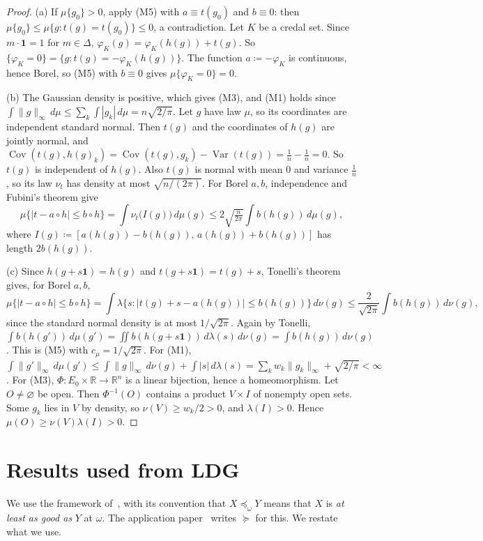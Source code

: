 \documentclass[11pt]{article}
\theoremstyle{definition}
\newcommand{\R}{\mathbb R}
\newcommand{\one}{\mathbf 1}
\begin{document}
\begin{proof}
(a) If $\mu\{g_0\}>0$, apply (M5) with $a\equiv t(g_0)$ and $b\equiv0$: then $\mu\{g_0\}\le\mu\{g:t(g)=t(g_0)\}\le0$, a contradiction. Let $K$ be a credal set. Since $m\cdot\one=1$ for $m\in\Delta$, $\varphi_K(g)=\varphi_K(h(g))+t(g)$. So $\{\varphi_K=0\}=\{g:t(g)=-\varphi_K(h(g))\}$. The function $a\coloneqq-\varphi_K$ is continuous, hence Borel, so (M5) with $b\equiv0$ gives $\mu\{\varphi_K=0\}=0$.

(b) The Gaussian density is positive, which gives (M3), and (M1) holds since $\int\|g\|_\infty\,d\mu\le\sum_k\int|g_k|\,d\mu=n\sqrt{2/\pi}$. Let $g$ have law $\mu$, so its coordinates are independent standard normal. Then $t(g)$ and the coordinates of $h(g)$ are jointly normal, and $\operatorname{Cov}(t(g),h(g)_k)=\operatorname{Cov}(t(g),g_k)-\operatorname{Var}(t(g))=\frac1n-\frac1n=0$. So $t(g)$ is independent of $h(g)$. Also $t(g)$ is normal with mean $0$ and variance $\frac1n$, so its law $\nu_t$ has density at most $\sqrt{n/(2\pi)}$. For Borel $a,b$, independence and Fubini's theorem give
\[
\mu\{|t-a\circ h|\le b\circ h\}=\int\nu_t\big(I(g)\big)\,d\mu(g)\le2\sqrt{\tfrac n{2\pi}}\int b(h(g))\,d\mu(g),
\]
where $I(g)\coloneqq[a(h(g))-b(h(g)),\,a(h(g))+b(h(g))]$ has length $2b(h(g))$.

(c) Since $h(g+s\one)=h(g)$ and $t(g+s\one)=t(g)+s$, Tonelli's theorem gives, for Borel $a,b$,
\[
\mu\{|t-a\circ h|\le b\circ h\}=\int\lambda\{s:|t(g)+s-a(h(g))|\le b(h(g))\}\,d\nu(g)\le\frac{2}{\sqrt{2\pi}}\int b(h(g))\,d\nu(g),
\]
since the standard normal density is at most $1/\sqrt{2\pi}$. Again by Tonelli, $\int b(h(g'))\,d\mu(g')=\iint b(h(g+s\one))\,d\lambda(s)\,d\nu(g)=\int b(h(g))\,d\nu(g)$. This is (M5) with $c_\mu=1/\sqrt{2\pi}$. For (M1), $\int\|g'\|_\infty\,d\mu(g')\le\int\|g\|_\infty\,d\nu(g)+\int|s|\,d\lambda(s)=\sum_kw_k\|g_k\|_\infty+\sqrt{2/\pi}<\infty$. For (M3), $\Phi:E_0\times\R\to\R^n$ is a linear bijection, hence a homeomorphism. Let $O\ne\varnothing$ be open. Then $\Phi^{-1}(O)$ contains a product $V\times I$ of nonempty open sets. Some $g_k$ lies in $V$ by density, so $\nu(V)\ge w_k/2>0$, and $\lambda(I)>0$. Hence $\mu(O)\ge\nu(V)\lambda(I)>0$.
\end{proof}

\section{Results used from LDG}\label{sec:ldg}

We use the framework of~\cite{LDG}, with its convention that $X\preceq_\omega Y$ means that $X$ is \emph{at least as good as} $Y$ at $\omega$. The application paper~\cite{App} writes $\succeq$ for this. We restate what we use.
\end{document}
